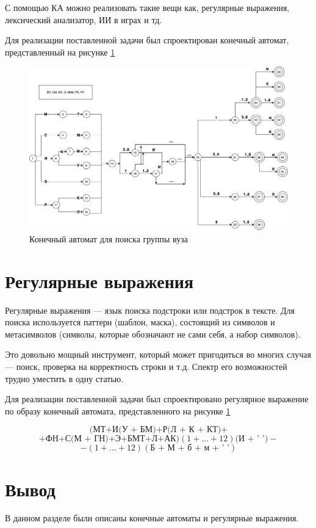 \documentclass[12pt, a4paper]{report}
\begin{document}
	С помощью КА можно реализовать такие вещи как, регулярные выражения, лексический анализатор, ИИ в играх и тд.
	
	Для реализации поставленной задачи был спроектирован конечный автомат, представленный на рисунке \ref{pic:fsm}
	
	\begin{figure}[ht!]
		\includegraphics[scale=0.4]{fsm.png}
		\caption{Конечный автомат для поиска группы вуза}
		\label{pic:fsm}
	\end{figure}

	\section{Регулярные выражения}
	
	Регулярные выражения — язык поиска подстроки или подстрок в тексте. Для поиска используется паттерн (шаблон, маска), состоящий из символов и метасимволов (символы, которые обозначают не сами себя, а набор символов).
	
	Это довольно мощный инструмент, который может пригодиться во многих случая — поиск, проверка на корректность строки и т.д. Спектр его возможностей трудно уместить в одну статью\cite{regular}.
	
	Для реализации поставленной задачи был спроектировано регулярное выражение по образу конечный автомата, представленного на рисунке \ref{pic:fsm}
	
	$$(\text{МТ+И(У + БМ)+Р(Л + К + КТ)+}$$
	$$\text{+ФН+С(М + ГН)+Э+БМТ+Л+АК})(1 + ... + 12)\text{(И + ' ')} -$$
	$$-(1 + ... + 12)(\text{Б + М + б + м + ' '})$$
	
	\section{Вывод}
	В данном разделе были описаны конечные автоматы и регулярные выражения.
\end{document}
